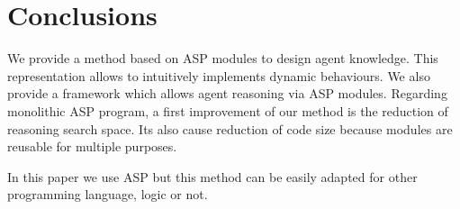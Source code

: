 \documentclass{aamas2012}
\begin{document}
\section{Conclusions}

	We provide a method based on ASP modules to design agent knowledge.
	This representation allows to intuitively implements dynamic behaviours.
	We also provide a framework which allows agent reasoning via ASP modules.
	Regarding monolithic ASP program, a first improvement of our method is the reduction of reasoning search space.
	Its also cause reduction of code size because modules are reusable for multiple purposes.
	
	In this paper we use ASP but this method can be easily adapted for other programming language, logic or not.
	
%

%
%

\nocite{*}
\end{document}
